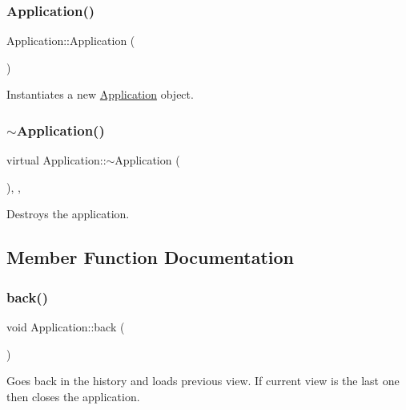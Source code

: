 \subsubsection{\texorpdfstring{Application()}{Application()}}
{\footnotesize\ttfamily Application\+::\+Application (\begin{DoxyParamCaption}{ }\end{DoxyParamCaption})}



Instantiates a new \mbox{\hyperlink{class_application}{Application}} object. 

\mbox{\label{class_application_af30193b728aeacfd07b56f6a1117182f}} 
\subsubsection{\texorpdfstring{$\sim$Application()}{~Application()}}
{\footnotesize\ttfamily virtual Application\+::$\sim$\+Application (\begin{DoxyParamCaption}{ }\end{DoxyParamCaption})\hspace{0.3cm}{\ttfamily [inline]}, {\ttfamily [override]}, {\ttfamily [virtual]}}



Destroys the application. 



\subsection{Member Function Documentation}
\mbox{\label{class_application_a7efbd7aad2bb4539e23d11b1f9dea252}} 
\subsubsection{\texorpdfstring{back()}{back()}}
{\footnotesize\ttfamily void Application\+::back (\begin{DoxyParamCaption}{ }\end{DoxyParamCaption})}



Goes back in the history and loads previous view. If current view is the last one then closes the application. 

